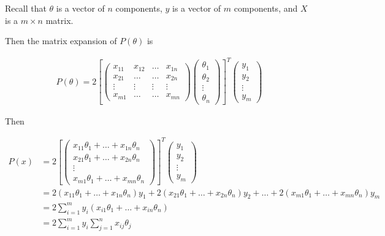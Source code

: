 \documentclass{article}
\begin{document}
        \noindent Recall that $\theta$ is a vector of $n$ components, $y$ is a vector of $m$ components, and
        $X$ is a $m\times n$ matrix.

        \noindent Then the matrix expansion of $P(\theta)$ is

        \begin{align*}
            P(\theta) = 2
            \left[
            \begin{pmatrix}
                x_{11} & x_{12} & \dots & x_{1n} \\
                x_{21} & \dots  & \dots & x_{2n} \\
                \vdots & \vdots & \vdots & \vdots \\
                x_{m1} & \dots & \dots & x_{mn}
            \end{pmatrix}
            \begin{pmatrix}
                \theta_1 \\
                \theta_2 \\
                \vdots \\
                \theta_n
            \end{pmatrix}
            \right]^T
            \begin{pmatrix}
                y_1 \\
                y_2 \\
                \vdots \\
                y_m
            \end{pmatrix}
        \end{align*}

        \noindent Then

        \begin{align*}
            P(x) &= 2
            \left[
            \begin{pmatrix}
                x_{11}\theta_1 + \dots + x_{1n}\theta_n \\
                x_{21}\theta_1 + \dots + x_{2n}\theta_n \\
                \vdots \\
                x_{m1}\theta_1 + \dots + x_{mn}\theta_n
            \end{pmatrix}
            \right]^T
            \begin{pmatrix}
                y_1 \\
                y_2 \\
                \vdots \\
                y_m
            \end{pmatrix} \\
            &= 2(x_{11}\theta_1+\dots+x_{1n}\theta_n)y_1 + 2(x_{21}\theta_1+\dots+x_{2n}\theta_n)y_2
            + \dots + 2(x_{m1}\theta_1+\dots+x_{mn}\theta_n)y_m \\
            &= 2\sum^m_{i=1}y_i(x_{i1}\theta_1 +\dots+ x_{in}\theta_n) \\
            &= 2\sum^m_{i=1}y_i \sum^n_{j=1} x_{ij}\theta_j
        \end{align*}
\end{document}
